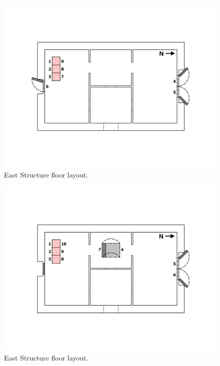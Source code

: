\documentclass[12pt,oneside]{book}
\begin{document}
\begin{figure}[!ht]
	\includegraphics[width=\columnwidth]{../Figures/Floor_Plans/East_Structure_Test_4}
	\caption[Dimensioned floor plan of the East Structure.]{East Structure floor layout.}
	\label{fig:east_test_4}
\end{figure}

\begin{figure}[!ht]
	\includegraphics[width=\columnwidth]{../Figures/Floor_Plans/East_Structure_Test_5}
	\caption[Dimensioned floor plan of the East Structure.]{East Structure floor layout.}
	\label{fig:east_test_5}
\end{figure}
\end{document}
